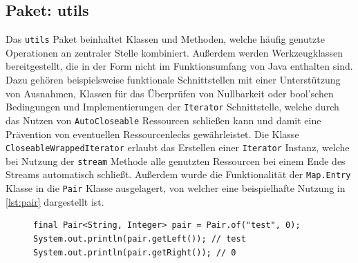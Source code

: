 \subsection{Paket: utils}
Das \texttt{utils} Paket beinhaltet Klassen und Methoden, welche häufig genutzte Operationen an zentraler Stelle kombiniert. Außerdem werden Werkzeugklassen bereitgestellt, die in der Form nicht im Funktionsumfang von Java enthalten sind. Dazu gehören beispielsweise funktionale Schnittstellen mit einer Unterstützung von Ausnahmen, Klassen für das Überprüfen von Nullbarkeit oder bool'schen Bedingungen und Implementierungen der \texttt{Iterator} Schnittstelle, welche durch das Nutzen von \texttt{AutoCloseable} Ressourcen schließen kann und damit eine Prävention von eventuellen Ressourcenlecks gewährleistet. Die Klasse \texttt{CloseableWrappedIterator} erlaubt das Erstellen einer \texttt{Iterator} Instanz, welche bei Nutzung der \texttt{stream} Methode alle genutzten Ressourcen bei einem Ende des Streams automatisch schließt. Außerdem wurde die Funktionalität der \texttt{Map.Entry} Klasse in die \texttt{Pair} Klasse ausgelagert, von welcher eine beispielhafte Nutzung in \autoref{lst:pair} dargestellt ist.
\begin{figure}[H]
	\begin{lstlisting}[caption=Beispiel -- Nutzung der \texttt{Pair} Klasse, captionpos=b, label=lst:pair]
final Pair<String, Integer> pair = Pair.of("test", 0);
System.out.println(pair.getLeft()); // test
System.out.println(pair.getRight()); // 0
	\end{lstlisting}
\end{figure}
